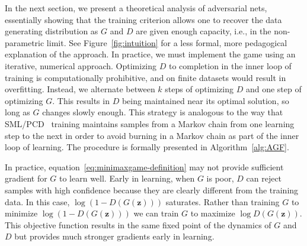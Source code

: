 In the next section, we present a theoretical analysis of adversarial nets,
essentially showing that the training criterion allows one to recover the data
generating distribution as $G$ and $D$ are given enough capacity, i.e., in the
non-parametric limit. See Figure~\ref{fig:intuition} for a less formal, more pedagogical
explanation of the approach.
In practice, we must implement the game using an iterative, numerical approach. Optimizing $D$ to completion in the
inner loop of training is computationally prohibitive,
and on finite datasets would result in overfitting. Instead, we alternate between $k$ steps
of optimizing $D$ and one step of optimizing $G$. This results in $D$ being maintained
near its optimal solution, so long as $G$ changes slowly enough. This strategy is analogous
to the way that SML/PCD~\citep{Younes1999,Tieleman08} training maintains samples from a Markov chain from one
learning step to the next in order to avoid burning in a Markov chain as part of the inner loop
of learning. The procedure is formally presented
in Algorithm~\ref{alg:AGF}.

In practice, equation~\ref{eq:minimaxgame-definition} may not provide sufficient gradient for $G$ to learn
well. Early in learning, when $G$ is poor, $D$ can reject samples with high confidence because they are
clearly different from the training data. In this case, $\log ( 1- D(G(\bm{z})))$ saturates. Rather than
training $G$ to minimize $\log (1 - D(G(\bm{z})))$ we can train $G$ to maximize $\log D(G(\bm{z}))$.
This objective function results in the same fixed point of the dynamics of $G$ and $D$ but provides much
stronger gradients early in learning.



